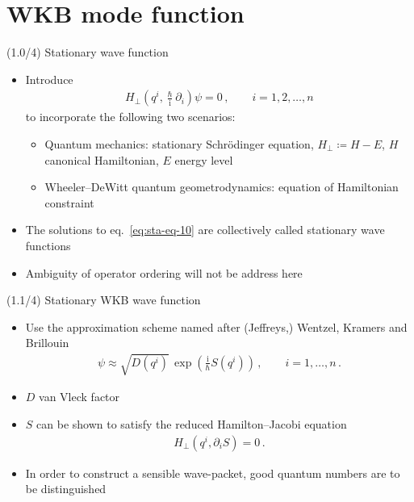 \documentclass[mathserif]{beamer}
\newcommand{\rfun}[2]{#1\mathopen{}\left(#2\right)\mathclose{}}
\newcommand\mi{\mathrm{i}} %
\begin{document}
\section{WKB mode function}


\begin{frame}{(1.0/4) Stationary wave function}
\begin{itemize}
\item
Introduce
\begin{align}
 \rfun{H_\perp}{q^i, \frac{\hslash}{\mi}\partial_i} \psi = 0\,,\qquad
 i = 1, 2, \ldots, n
 \label{eq:sta-eq-10}
\end{align}
to incorporate the following two scenarios:
\begin{itemize}
    \item Quantum mechanics: stationary Schr\"odinger equation, $H_\perp \coloneqq H - E$, $H$ canonical Hamiltonian, $E$ energy level
    \item Wheeler--DeWitt quantum geometrodynamics: equation of Hamiltonian constraint
\end{itemize}
\item
The solutions to eq.\ \eqref{eq:sta-eq-10} are collectively called \alert{stationary wave functions}
\item
Ambiguity of operator ordering will not be address here
\end{itemize}
\end{frame}

\begin{frame}{(1.1/4) Stationary WKB wave function}
\begin{itemize}
\item Use the approximation scheme named after
(Jeffreys,) Wentzel, Kramers and Brillouin
    \begin{align}
    \psi \approx \sqrt{\rfun{D}{q^i}}\,
    \rfun{\exp}{\frac{\mi}{\hslash} \rfun{S}{q^i}}\,,
    \qquad
    i = 1, \ldots, n\,.
\end{align}
    \item $D$ van Vleck factor
    \item $S$ can be shown to satisfy the reduced Hamilton--Jacobi equation
\begin{align}
    \rfun{H_\perp}{q^i, \partial_i S} = 0\,.
    \label{eq:packet-100}
\end{align}
    \item
    In order to construct a sensible wave-packet, \alert{good quantum numbers} are to be distinguished
\end{itemize}
\end{frame}
\end{document}
